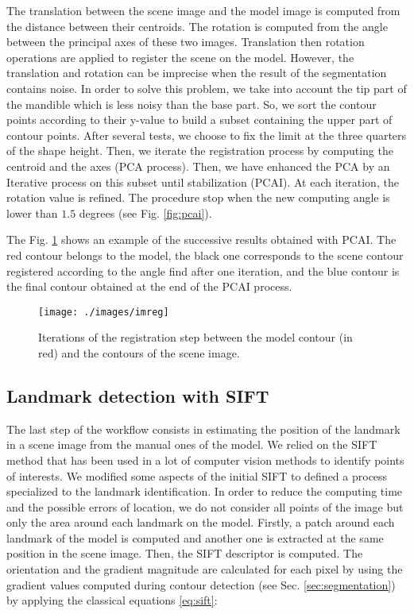 \documentclass[twoside,twocolumn,10pt]{article}
\begin{document}
The translation between the scene image and the model image is computed from the distance between their centroids.
The rotation is computed from the angle between the principal axes of these two images.
Translation then rotation operations are applied to register the scene on the model.
However, the translation and rotation can be imprecise when the result of the segmentation contains noise.
In order to solve this problem, we take into account the tip part of the mandible which is less noisy than the base part.
So, we sort the contour points according to their y-value to build a subset containing the upper part of contour points. After several tests, we choose to fix the limit at the  three quarters of the shape height. Then, we iterate the registration process by computing the centroid and the axes (PCA process). Then, we have enhanced the PCA by an Iterative process on this subset until stabilization (PCAI).
At each iteration, the rotation value is refined.
The procedure stop when the new computing angle is lower than $1.5$ degrees (see Fig. \ref{fig:pcai}).


The Fig. \ref{fig:box} shows an example of the successive results obtained with PCAI.
The red contour belongs to the model, the black one corresponds to the scene contour registered according to the angle find after one iteration, and the blue contour is the
final contour obtained at the end of the PCAI process.

\begin{figure}[htbp]
    \centering
    \texttt{[image: ./images/imreg]}
    \caption{Iterations of the registration step between the model contour (in red) and the contours of the scene image.}
    \label{fig:box}
\end{figure}

\subsection{Landmark detection with SIFT}
\label{sec:sift}

The last step of the workflow consists in estimating the position of the landmark in a scene image from the manual ones of the model.
We relied on the SIFT method \cite{lowe2004distinctive} that has been used in a lot of computer vision methods to identify points of interests.
We modified some aspects of the initial SIFT to defined a process specialized to the landmark identification.
In order to reduce the computing time and the possible errors of location, we do not consider all points of the image but only the area around each landmark on the model.
Firstly, a patch around each landmark of the model is computed and another one is extracted at the same position in the scene image.
Then, the SIFT descriptor is computed.
The orientation and the gradient magnitude are calculated for each pixel by using the gradient values computed during contour detection (see Sec. \ref{sec:segmentation}) by applying the classical equations \ref{eq:sift}:
\end{document}
